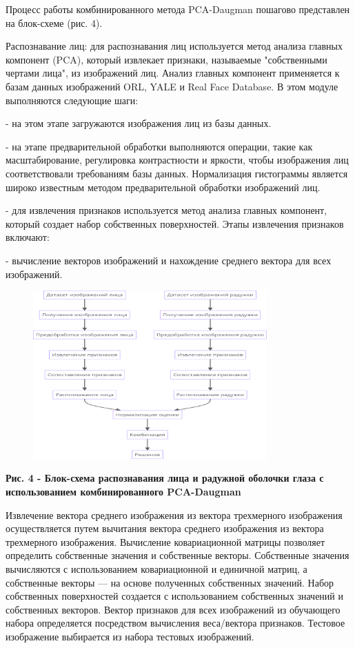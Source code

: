 Процесс работы комбинированного метода PCA-Daugman пошагово представлен
на блок-схеме (рис. 4).

Распознавание лиц: для распознавания лиц используется метод анализа
главных компонент (PCA), который извлекает признаки, называемые
"собственными чертами лица", из изображений лиц. Анализ главных
компонент применяется к базам данных изображений ORL, YALE и Real Face
Database. В этом модуле выполняются следующие шаги:

- на этом этапе загружаются изображения лиц из базы данных.

- на этапе предварительной обработки выполняются операции, такие как
масштабирование, регулировка контрастности и яркости, чтобы изображения
лиц соответствовали требованиям базы данных. Нормализация гистограммы
является широко известным методом предварительной обработки изображений
лиц.

- для извлечения признаков используется метод анализа главных компонент,
который создает набор собственных поверхностей. Этапы извлечения
признаков включают:

- вычисление векторов изображений и нахождение среднего вектора для всех
изображений.

\begin{figure}[H]
	\centering
	\includegraphics[width=0.8\textwidth]{assets/86}
	\caption*{}
\end{figure}

{\bfseries Рис. 4 - Блок-схема распознавания лица и радужной оболочки глаза
с использованием комбинированного PCA-Daugman}

Извлечение вектора среднего изображения из вектора трехмерного
изображения осуществляется путем вычитания вектора среднего изображения
из вектора трехмерного изображения. Вычисление ковариационной матрицы
позволяет определить собственные значения и собственные векторы.
Собственные значения вычисляются с использованием ковариационной и
единичной матриц, а собственные векторы --- на основе полученных
собственных значений. Набор собственных поверхностей создается с
использованием собственных значений и собственных векторов. Вектор
признаков для всех изображений из обучающего набора определяется
посредством вычисления веса/вектора признаков. Тестовое изображение
выбирается из набора тестовых изображений.


